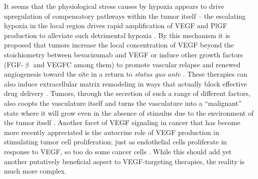 It seems that the physiological stress causes by hypoxia appears to drive upregulation of compensatory pathways within the tumor itself -- the escalating hypoxia in the local region drives rapid amplification of VEGF and PlGF production to alleviate such detrimental hypoxia \citep{Alidzanovic2016, Gardner2017}. By this mechanism it is proposed that tumors increase the local concentration of VEGF beyond the stoichiometry between bevacizumab and VEGF or induce other growth factors (FGF\hyp{}$\upbeta$ and VEGFC among them) to promote vascular relapse and renewed angiogenesis toward the site in a return to \textit{status quo ante} \citep{Haibe2020, Montemagno2020, Zhao2017, Zahra2021, Michaelsen2018}. These therapies can also induce extracellular matrix remodeling in ways that actually block effective drug delivery \citep{Rahbari2016}. Tumors, through the secretion of such a range of different factors, also coopts the vasculature itself and turns the vasculature into a ``malignant'' state where it will grow even in the absence of stimulus due to the environment of the tumor itself \citep{Frentzas2016}. Another facet of VEGF signaling in cancer that has become more recently appreciated is the autocrine role of VEGF production in stimulating tumor cell proliferation; just as endothelial cells proliferate in response to VEGF, so too do some cancer cells \citep{Goel2013, Ntellas2020}. While this should add yet another putatively beneficial aspect to VEGF\hyp{}targeting therapies, the reality is much more complex.

